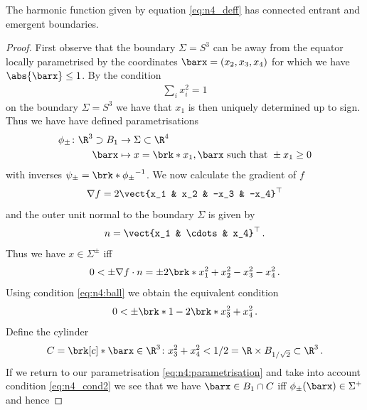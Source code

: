\begin{proposition}\label{pr:n4_connectedBd}
  The harmonic function given by equation \eqref{eq:n4_deff} has connected entrant and emergent boundaries.
\end{proposition}
\begin{proof}
  First observe that the boundary $\Sigma=S^3$ can be away from the equator locally parametrised by the coordinates $\barx = (x_2,x_3,x_4)$
  for which we have $\abs{\barx}\leq 1$. By the condition
  \begin{align}
    \sum_i x_i^2 = 1\label{eq:n4:ball}
  \end{align}
  on the boundary $\Sigma=S^3$ we have that $x_1$ is then uniquely determined up to sign.
  Thus we have have defined parametrisations
  \begin{align}
    \begin{aligned}\phi_\pm\colon \R^3\supset B_1&\to \Sigma\subset\R^4 \\
    \barx&\mapsto x=\brk*{x_1,\barx}\text{ such that } \pm x_1\geq0
    \end{aligned}\label{eq:n4:parametrisation}
  \end{align}
  with inverses $\psi_\pm = \brk*{\phi_\pm}^{-1}$.
  We now calculate the gradient of $f$
  \begin{align*}
    \nabla f = 2\vect{x_1 & x_2 & -x_3 & -x_4}^\top
  \end{align*}
  and the outer unit normal to the boundary $\Sigma$ is given by
  \begin{align*}
    n = \vect{x_1 & \cdots & x_4}^\top\,.
  \end{align*}
  Thus we have $x\in\Sigma^\pm$ iff
  \begin{align*}
    0<\pm \nabla f\cdot n = \pm 2\brk*{x_1^2+x_2^2-x_3^2-x_4^2}\,.
  \end{align*}
  Using condition \eqref{eq:n4:ball} we obtain the equivalent condition
  \begin{align}
	  0<\pm \brk*{1-2\brk*{x_3^2+x_4^2}}\,.\label{eq:n4_cond2}
  \end{align}
  Define the cylinder
  \begin{align*}
    C = \brk[c]*{\barx\in \R^3\colon x_3^2+x_4^2<1/2} = \R\times B_{1/\sqrt{2}}\subset\R^3\,.
  \end{align*}
  If we return to our parametrisation \eqref{eq:n4:parametrisation} and take into account condition \eqref{eq:n4_cond2} we see that we have $\barx\in B_1\cap C$ iff
  $\phi_\pm(\barx)\in \Sigma^+$ and hence 

\end{proof}
